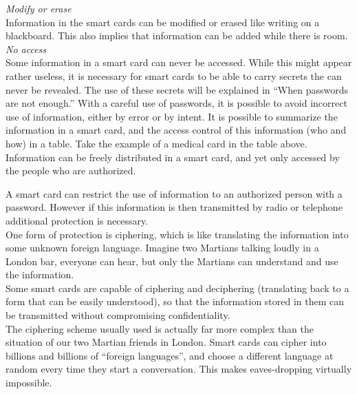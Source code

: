 \begin{htmllist}
    {\it Modify or erase}\\
    Information in the smart cards can be modified or erased like writing
    on a blackboard. This also implies that information can be added while
    there is room.\\
    
    {\it No access}\\
    Some information in a smart card can never be accessed. While this
    might appear rather useless, it is necessary for smart cards to be able
    to carry secrets the can never be revealed. The use of these secrets
    will be explained in ``When passwords are not enough.'' With a careful
    use of passwords, it is possible to avoid incorrect use of information,
    either by error or by intent. It is possible to summarize the
    information in a smart card, and the access control of this information
    (who and how) in a table. Take the example of a medical card in the
    table above. Information can be freely distributed in a smart card, and
    yet only accessed by the people who are authorized.\\

    
    A smart card can restrict the use of information to an authorized
    person with a password. However if this information is then transmitted
    by radio or telephone additional protection is necessary.\\
    
    One form of protection is ciphering, which is like translating the
    information into some unknown foreign language. Imagine two Martians
    talking loudly in a London bar, everyone can hear, but only the
    Martians can understand and use the information.\\
    
    Some smart cards are capable of ciphering and deciphering (translating
    back to a form that can be easily understood), so that the information
    stored in them can be transmitted without compromising confidentiality.\\
    
    The ciphering scheme usually used is actually far more complex than the
    situation of our two Martian friends in London. Smart cards can cipher
    into billions and billions of ``foreign languages'', and choose a
    different language at random every time they start a conversation. This
    makes eaves-dropping virtually impossible.\\
    

\end{htmllist}
